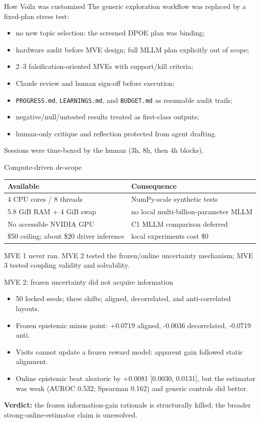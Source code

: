 \documentclass[aspectratio=169,10pt]{beamer}
\begin{document}
\begin{frame}{How Voila was customized}
The generic exploration workflow was replaced by a fixed-plan stress test:
\begin{itemize}
  \item no new topic selection: the screened DPOE plan was binding;
  \item hardware audit before MVE design; full MLLM plan explicitly out of scope;
  \item 2--3 falsification-oriented MVEs with support/kill criteria;
  \item Claude review and human sign-off before execution;
  \item \texttt{PROGRESS.md}, \texttt{LEARNINGS.md}, and \texttt{BUDGET.md} as resumable audit trails;
  \item negative/null/untested results treated as first-class outputs;
  \item human-only critique and reflection protected from agent drafting.
\end{itemize}
Sessions were time-boxed by the human (3h, 8h, then 4h blocks).
\end{frame}

\begin{frame}{Compute-driven de-scope}
\begin{tabular}{p{}p{}}
\toprule
Available & Consequence \\
\midrule
4 CPU cores / 8 threads & NumPy-scale synthetic tests \\
5.8 GiB RAM + 4 GiB swap & no local multi-billion-parameter MLLM \\
No accessible NVIDIA GPU & C1 MLLM comparison deferred \\
\$50 ceiling; about \$20 driver inference & local experiments cost \$0 \\
\bottomrule
\end{tabular}
\par\vspace{1em}
MVE 1 never ran. MVE 2 tested the frozen/online uncertainty mechanism; MVE 3 tested coupling validity and solvability.
\end{frame}

\begin{frame}{MVE 2: frozen uncertainty did not acquire information}
\begin{itemize}
  \item 50 locked seeds; three shifts; aligned, decorrelated, and anti-correlated layouts.
  \item Frozen epistemic minus point: +0.0719 aligned, -0.0036 decorrelated, -0.0719 anti.
  \item Visits cannot update a frozen reward model: apparent gain followed static alignment.
  \item Online epistemic beat aleatoric by +0.0081 [0.0030, 0.0131], but the estimator was weak (AUROC 0.532; Spearman 0.162) and generic controls did better.
\end{itemize}
\textbf{Verdict:} the frozen information-gain rationale is structurally killed; the broader strong-online-estimator claim is unresolved.
\end{frame}
\end{document}
